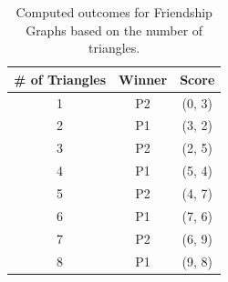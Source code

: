 \documentclass{article}
\begin{document}
\begin{table}[hbt!]
\centering
\begin{tabular}{|c|c|c|}
\hline
\textbf{\# of Triangles} & \textbf{Winner} & \textbf{Score} \\
\hline
1 & P2 & (0, 3) \\
2 & P1 & (3, 2) \\
3 & P2 & (2, 5) \\
4 & P1 & (5, 4) \\
5 & P2 & (4, 7) \\
6 & P1 & (7, 6) \\
7 & P2 & (6, 9) \\
8 & P1 & (9, 8) \\
\hline
\end{tabular}
\caption{Computed outcomes for Friendship Graphs based on the number of triangles.}
\label{table:friendship-graph-outcomes}
\end{table}
\FloatBarrier 
\end{document}
